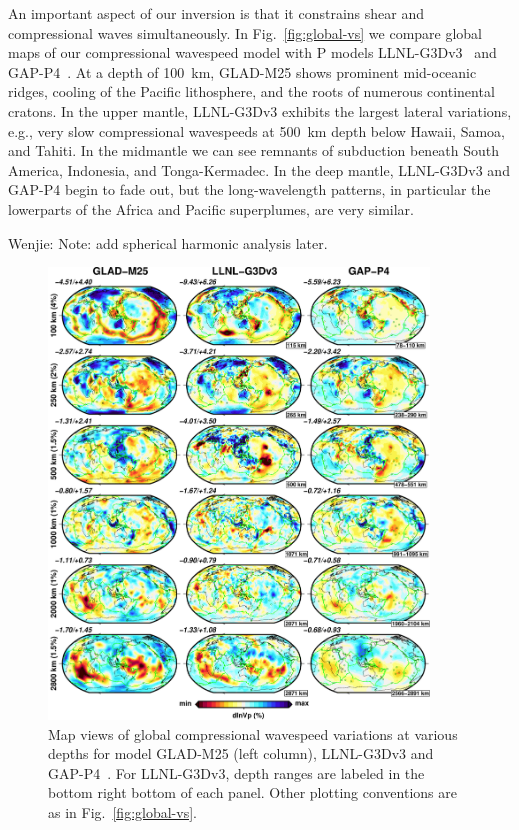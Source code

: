 \documentclass[extra,mreferee]{gji}
\begin{document}
An important aspect of our inversion is that it constrains shear and compressional waves simultaneously.
In Fig.~\ref{fig:global-vs} we compare global maps of our compressional wavespeed model with P models LLNL-G3Dv3~\citep{simmons2012llnl} and GAP-P4~\citep{fukao2013subducted}.
At a depth of 100~km,
GLAD-M25 shows prominent mid-oceanic ridges, cooling of the Pacific lithosphere, and the roots of numerous continental cratons.
In the upper mantle, LLNL-G3Dv3 exhibits the largest lateral variations,
e.g., very slow compressional wavespeeds at 500~km depth below Hawaii, Samoa, and Tahiti.
In the midmantle we can see remnants of subduction beneath South America, Indonesia,
and Tonga-Kermadec.
In the deep mantle, LLNL-G3Dv3 and GAP-P4 begin to fade out, but the long-wavelength patterns,
in particular the lowerparts of the Africa and Pacific superplumes, are very similar.

{\color{red} Wenjie: Note: add spherical harmonic analysis later.}

\begin{figure}
\includegraphics[width=0.9\textwidth]{figures/depth_slice/globe_vp_LLNL-GAP.pdf}
  \caption{Map views of global compressional wavespeed variations at various depths for model
  GLAD-M25 (left column), LLNL-G3Dv3 \citep[middle column;][]{simmons2012llnl} and
  GAP-P4~\citep[right column;][]{fukao2013subducted}.
  For LLNL-G3Dv3, depth ranges are labeled in the bottom right
  bottom of each panel. Other plotting conventions are as in Fig.~\ref{fig:global-vs}.}
\label{fig:global-vp}
\centering
\end{figure}
\end{document}
